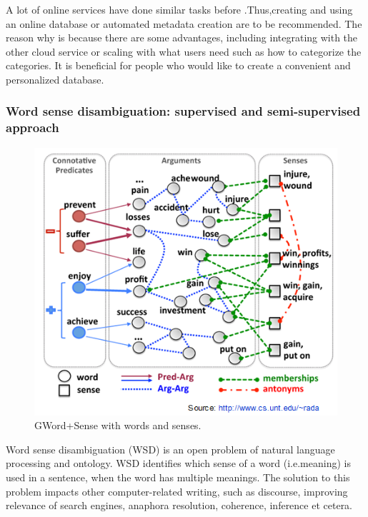 A lot of online services have done similar tasks before .Thus,creating and using an online database or automated metadata creation are to be recommended. The reason why is because there are some advantages, including integrating with the other cloud service or scaling with what users need such as how to categorize the categories. It is beneficial for people who would like to create a convenient and personalized database.    \\

\subsubsection*{Word sense disambiguation: supervised and semi-supervised approach}

\begin{figure}[tbh]
	\begin{center}
		\includegraphics[width=\columnwidth]{union(WSD)}
	\end{center}
	\caption{GWord+Sense with words and senses. \label{fig1}}
\end{figure}

Word sense disambiguation (WSD) is an open problem of natural language processing and ontology. WSD identifies which sense of a word (i.e.meaning) is used in a sentence, when the word has multiple meanings. The solution to this problem impacts other computer-related writing, such as discourse, improving relevance of search engines, anaphora resolution, coherence, inference et cetera.

